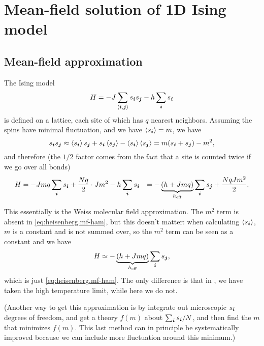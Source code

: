 \documentclass[hyperref, a4paper]{article}
\newcommand*{\pair}[1]{\langle #1 \rangle}
\def\\{}%
\begin{document}
\section{Mean-field solution of 1D Ising model}

\subsection{Mean-field approximation}\label{sec:ising.mf}

The Ising model 
\begin{equation}
    H = - J \sum_{\pair{\vb*{i}, \vb*{j}}} s_{\vb*{i}} s_{\vb*{j}} - h \sum_{\vb*{i}} s_{\vb*{i}}
\end{equation}
is defined on a lattice,
each site of which has $q$ nearest neighbors.
Assuming the spins have minimal fluctuation, 
and we have $\expval{s_{\vb*{i}}} = m$, 
we have 
\[
    s_{\vb*{i}} s_{\vb*{j}} \approx 
    \expval{s_{\vb*{i}}} s_{\vb*{j}} + s_{\vb*{i}} \expval{s_{\vb*{j}}} 
    - \expval{s_{\vb*{i}}} \expval{s_{\vb*{j}}} = 
    m (s_{\vb*{i}} + s_{\vb*{j}}) - m^2,
\]
and therefore (the $1/2$ factor comes from the fact that a site is counted twice 
if we go over all bonds)
\begin{equation}
    \begin{aligned}
        H &= - J m q \sum_{\vb*{i}} s_{\vb*{i}} 
        + \frac{N q}{2} \cdot J m^2 - h \sum_{\vb*{i}} s_{\vb*{i}} \\
        &= - \underbrace{(h + Jmq)}_{h_{\text{eff}}} \sum_{\vb*{i}} s_{\vb*{j}} 
        + \frac{NqJm^2}{2} .
    \end{aligned}
\end{equation}

This essentially is the Weiss molecular field approximation.
The $m^2$ term is absent in \eqref{eq:heisenberg.mf-ham}, 
but this doesn't matter: 
when calculating $\expval{s_{\vb*{i}}}$, 
$m$ is a constant and is not summed over, 
so the $m^2$ term can be seen as a constant 
and we have 
\[
    H \simeq - \underbrace{(h + Jmq)}_{h_{\text{eff}}} \sum_{\vb*{i}} s_{\vb*{j}} ,
\]
which is just \eqref{eq:heisenberg.mf-ham}.
The only difference is that in ,
we have taken the high temperature limit, 
while here we do not.

(Another way to get this approximation is 
by integrate out microscopic $s_{\vb*{i}}$ degrees of freedom, 
and get a theory $f(m)$ about $\sum_{\vb*{i}} s_{\vb*{i}} / N$, 
and then find the $m$ that minimizes $f(m)$.
This last method can in principle be systematically improved 
because we can include more fluctuation around this minimum.) 
\end{document}
